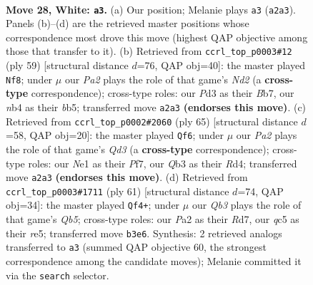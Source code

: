 \documentclass[11pt]{article}
\begin{document}
\clearpage

\begin{figure}[p]\centering
\begin{subfigure}{0.46\textwidth}\centering
\resizebox{\linewidth}{!}{%
\newchessgame
\chessboard[
  setfen={n1b4r/1p4k1/8/2q3pp/1n6/1Q1P1P2/P7/4NB1K w - - 0 28},
  showmover=false,
  pgfstyle=straightmove, color=movearrow, markmove={a2-a3}
]}
\caption{}
\end{subfigure}\hfill
\begin{subfigure}{0.46\textwidth}\centering
\resizebox{\linewidth}{!}{%
\newchessgame
\chessboard[
  setfen={6k1/1b1n1p1p/1q4p1/1B1p4/3N4/4P2P/Q4PP1/6K1 b - - 2 30},
  showmover=false,
  pgfstyle=straightmove, color=movearrow, markmove={d7-f8}
]}
\caption{}
\end{subfigure}
\\[4pt]
\begin{subfigure}{0.46\textwidth}\centering
\resizebox{\linewidth}{!}{%
\newchessgame
\chessboard[
  setfen={8/1b3pk1/2pq3p/7p/1PNr4/8/5PP1/1RQ3K1 b - - 0 33},
  showmover=false,
  pgfstyle=straightmove, color=movearrow, markmove={d6-f6}
]}
\caption{}
\end{subfigure}\hfill
\begin{subfigure}{0.46\textwidth}\centering
\resizebox{\linewidth}{!}{%
\newchessgame
\chessboard[
  setfen={6k1/3r2pp/p4n2/2N1R3/1q6/8/1PP1Q2P/2K5 b - - 2 31},
  showmover=false,
  pgfstyle=straightmove, color=movearrow, markmove={b4-f4}
]}
\caption{}
\end{subfigure}
\caption{\textbf{Move 28, White: \texttt{a3}.} (a) Our position; Melanie plays \texttt{a3} (\texttt{a2a3}). Panels (b)--(d) are the retrieved master positions whose correspondence most drove this move (highest QAP objective among those that transfer to it). (b) Retrieved from \texttt{ccrl\_top\_p0003\#12} (ply 59) [structural distance $d$=76, QAP obj=40]: the master played \texttt{Nf8}; under $\mu$ our \emph{Pa2} plays the role of that game's \emph{Nd2} (a \textbf{cross-type} correspondence); cross-type roles: our \emph{P}d3 as their \emph{B}b7, our \emph{n}b4 as their \emph{b}b5; transferred move \texttt{a2a3} \textbf{(endorses this move)}. (c) Retrieved from \texttt{ccrl\_top\_p0002\#2060} (ply 65) [structural distance $d$=58, QAP obj=20]: the master played \texttt{Qf6}; under $\mu$ our \emph{Pa2} plays the role of that game's \emph{Qd3} (a \textbf{cross-type} correspondence); cross-type roles: our \emph{N}e1 as their \emph{P}f7, our \emph{Q}b3 as their \emph{R}d4; transferred move \texttt{a2a3} \textbf{(endorses this move)}. (d) Retrieved from \texttt{ccrl\_top\_p0003\#1711} (ply 61) [structural distance $d$=74, QAP obj=34]: the master played \texttt{Qf4+}; under $\mu$ our \emph{Qb3} plays the role of that game's \emph{Qb5}; cross-type roles: our \emph{P}a2 as their \emph{R}d7, our \emph{q}c5 as their \emph{r}e5; transferred move \texttt{b3e6}. Synthesis: 2 retrieved analogs transferred to \texttt{a3} (summed QAP objective 60, the strongest correspondence among the candidate moves); Melanie committed it via the \texttt{search} selector.}
\label{fig:thought-m54}
\end{figure}
\end{document}
